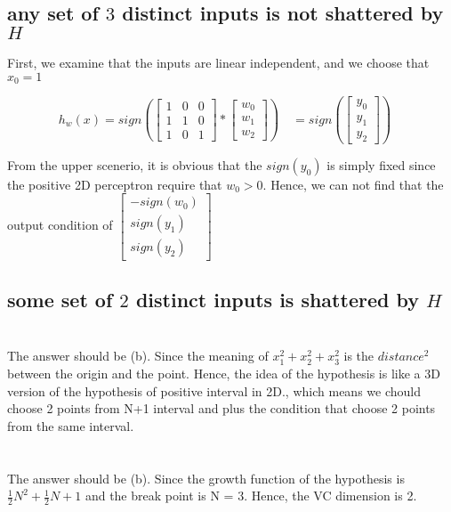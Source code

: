 \documentclass{article}
\begin{document}
\begin{CJK*}{UTF8}{bsmi}
\subsection*{any set of $3$ distinct inputs is not shattered by $H$}
	First, we examine that the inputs are linear independent, and we choose that $x_0 = 1$ 
	
	\begin{displaymath} 
		h_w(x) = sign ( \begin{bmatrix}  1&0&0\\ 1&1&0\\ 1&0&1 \end{bmatrix}* \begin{bmatrix}  w_0\\w_1\\w_2 \end{bmatrix})\quad = sign ( \begin{bmatrix}  y_0\\y_1\\y_2 \end{bmatrix})\quad
	\end{displaymath} 
 	
 	From the upper scenerio, it is obvious that the $sign(y_0)$ is simply fixed since the positive 2D perceptron require that $w_0 > 0$. Hence, we can not find that the output condition of $\begin{bmatrix}  -sign(w_0)\\sign(y_1)\\sign(y_2) \end{bmatrix}\quad$
\subsection*{some set of $2$ distinct inputs is shattered by $H$}

\section{}%
The answer should be (b). Since the meaning of $x_1^2 + x_2^2 +x_3^2 $ is the $distance^2$ between the origin and the point. Hence, the idea of the hypothesis is like a 3D version of the hypothesis of positive interval in 2D., which means we chould choose 2 points from N+1 interval and plus the condition that choose 2 points from the same interval. 

\section{}%
The answer should be (b). Since the growth function of the hypothesis is $\frac{1}{2}N^2 + \frac{1}{2}N + 1$ and the break point is N = 3. Hence, the VC dimension is 2.


\end{CJK*}
\end{document}
